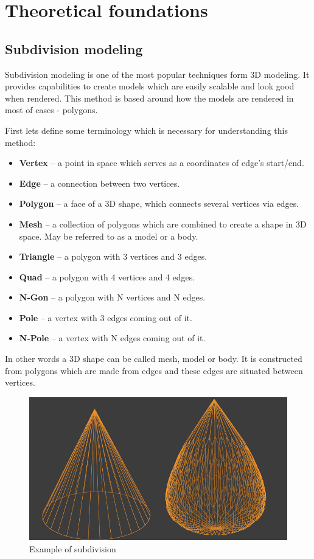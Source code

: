 \documentclass[12pt,a4paper,titlepage,final]{report}
\begin{document}
\section{Theoretical foundations}
\subsection{Subdivision modeling}
Subdivision modeling is one of the most popular techniques form 3D modeling. It provides capabilities to create models which are easily scalable and look good when rendered. This method is based around how the models are rendered in most of cases - polygons. 

First lets define some terminology which is necessary for understanding this method:

\begin{itemize}
    \item \textbf{Vertex} -- a point in space which serves as a coordinates of edge's start/end.
    \item \textbf{Edge} -- a connection between two vertices.
    \item \textbf{Polygon} -- a face of a 3D shape, which connects several vertices via edges.
    \item \textbf{Mesh} -- a collection of polygons which are combined to create a shape in 3D space. May be referred to as a model or a body.
    \item \textbf{Triangle} -- a polygon with 3 vertices and 3 edges.
    \item \textbf{Quad} -- a polygon with 4 vertices and 4 edges.
    \item \textbf{N-Gon} -- a polygon with N vertices and N edges.
    \item \textbf{Pole} -- a vertex with 3 edges coming out of it.
    \item \textbf{N-Pole} -- a vertex with N edges coming out of it.
\end{itemize}

In other words a 3D shape can be called mesh, model or body. It is constructed from polygons which are made from edges and these edges are situated between vertices. 

\begin{figure}[H]
    \centering
    \includegraphics{images/subdiv.jpg}
    \caption{Example of subdivision}
    \label{fig:subdivision}
\end{figure}
\end{document}
